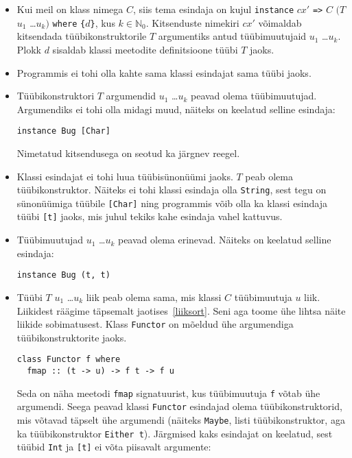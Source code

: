 \documentclass[12pt]{article}
\begin{document}
        \begin{itemize}
          \item
            Kui meil on klass nimega $C$, siis tema esindaja on kujul \verb!instance! $cx'$ \verb!=>! $C$ $(T$ $u_1$ \ldots $u_k)$ \verb!where! \verb!{!$d$\verb!}!, kus $k\in\mathbb{N}_0$. Kitsenduste nimekiri $cx'$ võimaldab kitsendada tüübikonstruktorile $T$ argumentiks antud tüübimuutujaid $u_1$ \ldots $u_k$. Plokk $d$ sisaldab klassi meetodite definitsioone tüübi $T$ jaoks.
          \item
            Programmis ei tohi olla kahte sama klassi esindajat sama tüübi jaoks.
          \item
            Tüübikonstruktori $T$ argumendid $u_1$ \ldots $u_k$ peavad olema tüübimuutujad. Argumendiks ei tohi olla midagi muud, näiteks on keelatud selline esindaja:

            \begin{verbatim}instance Bug [Char]\end{verbatim}

            Nimetatud kitsendusega on seotud ka järgnev reegel.
          \item
            Klassi esindajat ei tohi luua tüübisünonüümi jaoks. $T$ peab olema tüübikonstruktor. Näiteks ei tohi klassi esindaja olla \verb!String!, sest tegu on sünonüümiga tüübile \verb![Char]! ning programmis võib olla ka klassi esindaja tüübi \verb![t]! jaoks, mis juhul tekiks kahe esindaja vahel kattuvus.
          \item
            Tüübimuutujad $u_1$ \ldots $u_k$ peavad olema erinevad. Näiteks on keelatud selline esindaja:

            \begin{verbatim}instance Bug (t, t)\end{verbatim}
          \item
            Tüübi $T$ $u_1$ \ldots $u_k$ liik peab olema sama, mis klassi $C$ tüübimuutuja $u$ liik. Liikidest räägime täpsemalt jaotises~\ref{liiksort}. Seni aga toome ühe lihtsa näite liikide sobimatusest. Klass \verb!Functor! on mõeldud ühe argumendiga tüübikonstruktorite jaoks.

            \begin{verbatim}class Functor f where
  fmap :: (t -> u) -> f t -> f u\end{verbatim}

            Seda on näha meetodi \verb!fmap! signatuurist, kus tüübimuutuja \verb!f! võtab ühe argumendi. Seega peavad klassi \verb!Functor! esindajad olema tüübikonstruktorid, mis võtavad täpselt ühe argumendi (näiteks \verb!Maybe!, listi tüübikonstruktor, aga ka tüübikonstruktor \verb!Either t!). Järgmised kaks esindajat on keelatud, sest tüübid \verb!Int! ja \verb![t]! ei võta piisavalt argumente:


\end{itemize}
\end{document}
